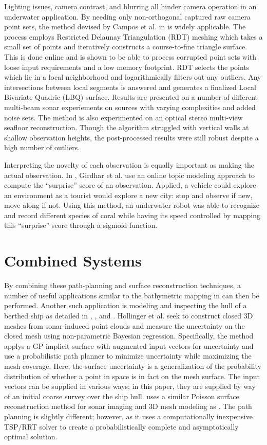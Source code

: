 \documentclass[double,12pt]{beavtex}
\begin{document}
Lighting issues, camera contrast, and blurring all hinder camera operation in an underwater application. By needing only non-orthogonal captured raw camera point sets, the method devised by Campos et al. in \cite{campos} is widely applicable. The process employs Restricted Delaunay Triangulation (RDT) meshing which takes a small set of points and iteratively constructs a course-to-fine triangle surface. This is done online and is shown to be able to process corrupted point sets with loose input requirements and a low memory footprint. RDT selects the points which lie in a local neighborhood and logarithmically filters out any outliers. Any intersections between local segments is answered and generates a finalized Local Bivariate Quadric (LBQ) surface. Results are presented on a number of different multi-beam sonar experiements on sources with varying complexities and added noise sets. The method is also experimented on an optical stereo multi-view seafloor reconstruction. Though the algorithm struggled with vertical walls at shallow observation heights, the post-processed results were still robust despite a high number of outliers.

Interpreting the novelty of each observation is equally important as making the actual observation. In \cite{girdhar}, Girdhar et al. use an online topic modeling approach to compute the “surprise” score of an observation. Applied, a vehicle could explore an environment as a tourist would explore a new city: stop and observe if new, move along if not. Using this method, an underwater robot was able to recognize and record different species of coral while having its speed controlled by mapping this “surprise” score through a sigmoid function.
 
\section{Combined Systems}
By combining these path-planning and surface reconstruction techniques, a number of useful applications similar to the bathymetric mapping in \cite{galceran} can then be performed. Another such application is modeling and inspecting the hull of a berthed ship as detailed in \cite{geoffadapt}, \cite{geoffuncertainty}, and \cite{hover}. Hollinger et al. seek to construct closed 3D meshes from sonar-induced point clouds and measure the uncertainty on the closed mesh using non-parametric Bayesian regression. Specifically, the method applys a GP implicit surface with augmented input vectors for uncertainty and use a probabilistic path planner to minimize uncertainty while maximizing the mesh coverage. Here, the surface uncertainty is a generalization of the probability distribution of whether a point in space is in fact on the mesh surface. The input vectors can be supplied in various ways; in this paper, they are supplied by way of an initial coarse survey over the ship hull. \cite{hover} uses a similar Poisson surface reconstruction method for sonar imaging and 3D mesh modeling as \cite{geoffadapt}. The path planning is slightly different; however, as it uses a computationally inexpensive TSP/RRT solver to create a probabilistically complete and asymptotically optimal solution.
\end{document}
